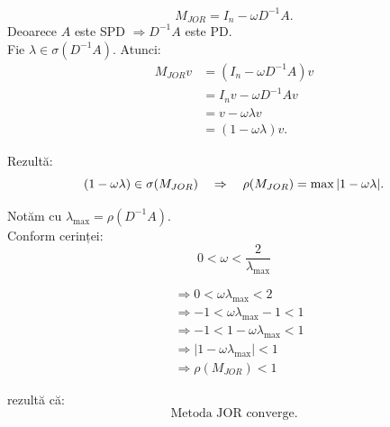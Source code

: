 \begin{demonstratie}
    $$
    M_{JOR} = I_n - \omega D^{-1}A.
    $$
    Deoarece $A$ este SPD $\Rightarrow D^{-1}A$ este PD.\\[0.5em]

    \noindent Fie \(\lambda \in \sigma(D^{-1}A)\). Atunci:
    \begin{align*}
        M_{JOR}v &= (I_n - \omega D^{-1}A)v \\[0.5em]
        &= I_n v - \omega D^{-1}A v \\[0.5em]
        &= v - \omega \lambda v \\[0.5em]
        &= (1 - \omega \lambda)v.
    \end{align*}

    Rezultă:
    $$
    (1 - \omega \lambda) \in \sigma(M_{JOR}) \quad \Rightarrow \quad \rho(M_{JOR}) = \max |1 - \omega \lambda|.\\[0.5em]
    $$

    Notăm cu \(\lambda_{\max} = \rho(D^{-1}A)\). \\[0.5em]

    Conform cerinței:
    $$
    0 < \omega < \frac{2}{\lambda_{\max}}
    $$

    \begin{align*}
        &\Rightarrow 0 < \omega \lambda_{\max} < 2 \\[0.5em]
        &\Rightarrow -1 < \omega \lambda_{\max} - 1 < 1 \\[0.5em]
        &\Rightarrow -1 < 1 - \omega \lambda_{\max} < 1 \\[0.5em]
        &\Rightarrow |1 - \omega \lambda_{\max}| < 1 \\[0.5em]
        &\Rightarrow \rho(M_{JOR}) < 1 
    \end{align*}

    rezultă că:
    $$
    \boxed{\text{Metoda JOR converge.}}
    $$
\end{demonstratie}